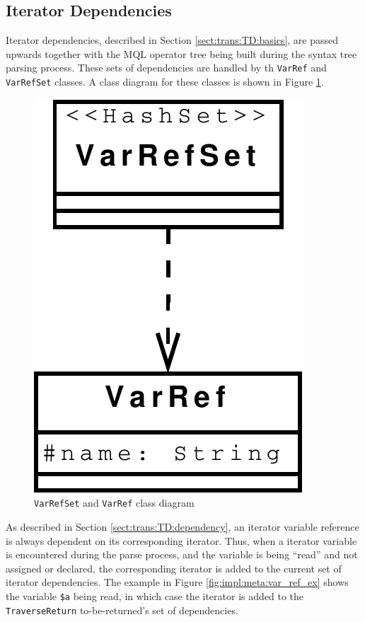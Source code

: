 \subsection{Iterator Dependencies}
Iterator dependencies, described in Section \ref{sect:trans:TD:basics}, are
passed upwards together with the MQL operator tree being built during the syntax
tree parsing process. These sets of dependencies are handled by th \texttt{VarRef} and \texttt{VarRefSet} classes.
A class diagram for these classes is shown in Figure \ref{fig:impl:meta:varrefset_uml}.

\begin{figure}[!htp]
\begin{center}
  \includegraphics[scale=0.5]{diagrams/varrefset_uml}
  \caption{\texttt{VarRefSet} and \texttt{VarRef} class diagram}
  \label{fig:impl:meta:varrefset_uml}
\end{center}
\end{figure}

As described in Section \ref{sect:trans:TD:dependency}, an iterator variable reference is always dependent on
its corresponding iterator. Thus, when a iterator variable is encountered during the parse process, and the
variable is being ``read'' and not assigned or declared, the corresponding iterator is added to the current set of
iterator dependencies. The example in Figure \ref{fig:impl:meta:var_ref_ex} shows the variable \texttt{\$a}
being read, in which case the iterator is added to the \texttt{TraverseReturn}
to-be-returned's set of dependencies.

